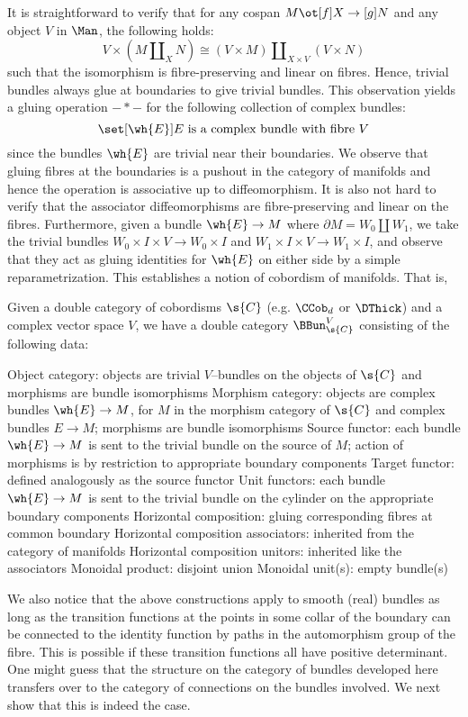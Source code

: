 \documentclass[\PRJWD/Thick_TQFTs_and_Quantum_Information.tex]{subfiles}
\begin{document}
It is straightforward to verify that for any cospan $M \ot[f] X \to[g] N$ and
any object $V$ in $\Man$, the following holds:
\[
  V \times (M \amalg_X N) \cong (V \times M) \amalg_{X \times V} (V \times N)
\]
such that the isomorphism is fibre-preserving and linear on fibres. Hence,
trivial bundles always glue at boundaries to give trivial bundles. This
observation yields a gluing operation $- * -$ for the following collection of
complex bundles:
\[
  \set[\wh{E}]{E \text{ is a complex bundle with fibre } V}
\]
since the bundles $\wh{E}$ are trivial near their boundaries. We observe that
gluing fibres at the boundaries is a pushout in the category of manifolds and
hence the operation is associative up to diffeomorphism. It is also not hard to
verify that the associator diffeomorphisms are fibre-preserving and linear on
the fibres. Furthermore, given a bundle $\wh{E} \to M$ where
$\partial M = W_0 \amalg W_1$, we take the trivial bundles
$W_0 \times I \times V \to W_0 \times I$ and
$W_1 \times I \times V \to W_1 \times I$, and observe that they act as gluing
identities for $\wh{E}$ on either side by a simple reparametrization. This
establishes a notion of cobordism of manifolds. That is,
\begin{thm}
Given a double category of cobordisms $\s{C}$ (e.g. $\CCob_d$ or $\DThick$)
and a complex vector space $V$, we have a double category $\BBun^V_{\s{C}}$
consisting of the following data:
\begin{enmrt}
\li Object category: objects are trivial $V$--bundles on the objects of $\s{C}$
and morphisms are bundle isomorphisms
\li Morphism category: objects are complex bundles $\wh{E} \to M$, for $M$ in
the morphism category of $\s{C}$ and complex bundles $E \to M$; morphisms are
bundle isomorphisms
\li Source functor: each bundle $\wh{E} \to M$ is sent to the trivial bundle on
the source of $M$; action of morphisms is by restriction to appropriate boundary
components
\li Target functor: defined analogously as the source functor
\li Unit functors: each bundle $\wh{E} \to M$ is sent to the trivial bundle on
the cylinder on the appropriate boundary components
\li Horizontal composition: gluing corresponding fibres at common boundary
\li Horizontal composition associators: inherited from the category of manifolds
\li Horizontal composition unitors: inherited like the associators
\li Monoidal product: disjoint union
\li Monoidal unit(s): empty bundle(s)
\end{enmrt}
\end{thm}

We also notice that the above constructions apply to smooth (real) bundles as
long as the transition functions at the points in some collar of the boundary
can be connected to the identity function by paths in the automorphism group of
the fibre. This is possible if these transition functions all have positive
determinant.  One might guess that the
structure on the category of bundles developed here transfers over to the
category of connections on the bundles involved. We next show that this is
indeed the case.
\end{document}
